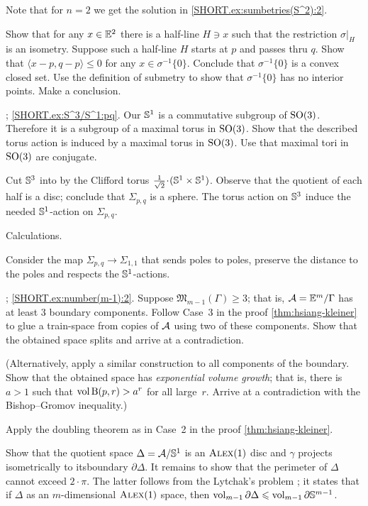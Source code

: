 Note that for $n=2$ we get the solution in \ref{SHORT.ex:sumbetries(S^2):2}.

Show that for any $x\in\mathbb{E}^2$ there is a half-line $H\ni x$ such that 
the restriction $\sigma|_H$ is an isometry.
Suppose such a half-line $H$ starts at $p$ and passes thru $q$.
Show that $\langle x-p,q-p \rangle\le 0$ for any $x\in \sigma^{-1}\{0\}$.
Conclude that $\sigma^{-1}\{0\}$ is a convex closed set.
Use the definition of submetry to show that  $\sigma^{-1}\{0\}$ has no interior points.
Make a conclusion.

\parbf{\ref{ex:S^3/S^1}};
\ref{SHORT.ex:S^3/S^1:pq}.
Our $\mathbb{S}^1$ is a commutative subgroup of $\mathrm{SO}(3)$.
Therefore it is a subgroup of a maximal torus in $\mathrm{SO}(3)$.
Show that the described torus action is induced by a maximal torus in $\mathrm{SO}(3)$.
Use that maximal tori in $\mathrm{SO}(3)$ are conjugate.

Cut $\mathbb{S}^3$ into by the Clifford torus $\tfrac1{\sqrt2}\cdot (\SSS^1\times \SSS^1)$.
Observe that the quotient of each half is a disc;
conclude that $\Sigma_{p,q}$ is a sphere.
The torus action on $\mathbb{S}^3$ induce the needed $\mathbb{S}^1$-action on $\Sigma_{p,q}$.

 Calculations.

Consider the map $\Sigma_{p,q}\to\Sigma_{1,1}$ that sends poles to poles,
preserve the distance to the poles and respects the $\mathbb{S}^1$-actions.

\parbf{\ref{ex:number(m-1)}};
\ref{SHORT.ex:number(m-1):2}.
Suppose $\mathfrak{M}_{m-1}(\Gamma)\ge 3$;
that is, $\mathcal{A}=\mathbb{E}^m/\Gamma$ has at least 3 boundary components.
Follow Case~3 in the proof \ref{thm:hsiang-kleiner} to glue a train-space from copies of $\mathcal{A}$ using two of these components.
Show that the obtained space splits and arrive at a contradiction.

(Alternatively, apply a similar construction to all components of the boundary.
Show that the obtained space has {}\emph{exponential volume growth};
that is, there is $a>1$ such that $\operatorname{\rm vol}\nolimits \mathrm{B}{}(p,r)>a^r$ for all large~$r$.
Arrive at a contradiction with the Bishop--Gromov inequality.)

Apply the doubling theorem as in Case~2 in the proof \ref{thm:hsiang-kleiner}.

Show that the quotient space $\Delta=\mathcal{A}/\mathbb{S}^1$ is an $\textsc{Alex}(1)$ disc and $\gamma$ projects isometrically to itsboundary $\partial\Delta$.
It remains to show that the perimeter of $\Delta$ cannot exceed $2\cdot\pi$.
The latter follows from the Lytchak's problem \cite[3.3.5]{petrunin:survey};
it states that if $\Delta$ as an $m$-dimensional $\textsc{Alex}(1)$ space, then $\operatorname{\rm vol}\nolimits_{m-1}\partial \Delta\leqslant \operatorname{\rm vol}\nolimits_{m-1}\partial \mathbb{S}^{m-1}$.

